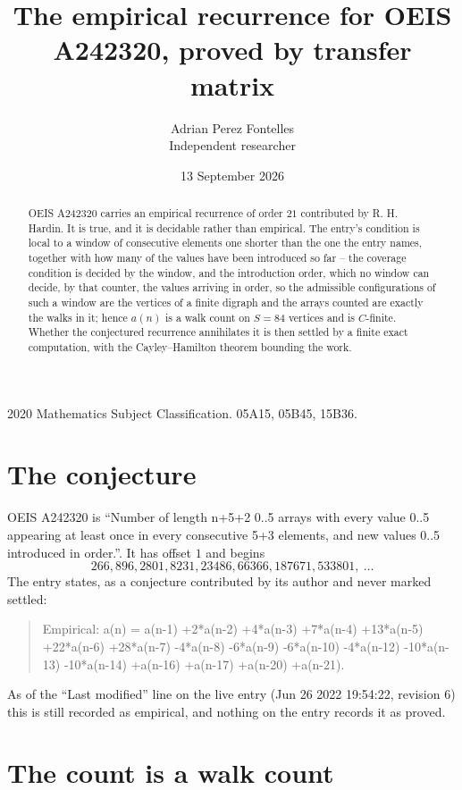 \documentclass[11pt,a4paper]{article}
\title{The empirical recurrence for OEIS A242320, proved by transfer matrix}
\author{Adrian Perez Fontelles\\ \small Independent researcher}
\date{13 September 2026}
\theoremstyle{plain}
\theoremstyle{definition}
\begin{document}
\maketitle

\begin{abstract}
OEIS A242320 carries an empirical recurrence of order $21$ contributed by R. H. Hardin. It is
true, and it is decidable rather than empirical. The entry's condition is local to a window of consecutive elements one shorter than the one the entry names, together with how many of the values have been introduced so far -- the coverage condition is decided by the window, and the introduction order, which no window can decide, by that counter, the values arriving in order, so
the admissible configurations of such a window are the vertices of a finite digraph and the
arrays counted are exactly the walks in it; hence $a(n)$ is a walk count on $S=84$ vertices
and is $C$-finite. Whether the conjectured recurrence annihilates it is then settled by a
finite exact computation, with the Cayley--Hamilton theorem bounding the work.
\end{abstract}

\noindent\small 2020 Mathematics Subject Classification. 05A15, 05B45, 15B36.\normalsize

\section{The conjecture}

OEIS A242320 is ``Number of length n+5+2 0..5 arrays with every value 0..5 appearing at least once in every consecutive 5+3 elements, and new values 0..5 introduced in order.''. It has offset $1$ and begins
\[
266, 896, 2801, 8231, 23486, 66366, 187671, 533801,\ \dots
\]
The entry states, as a conjecture contributed by its author and never marked settled:
\begin{quote}
Empirical: a(n) = a(n-1) +2*a(n-2) +4*a(n-3) +7*a(n-4) +13*a(n-5) +22*a(n-6) +28*a(n-7) -4*a(n-8) -6*a(n-9) -6*a(n-10) -4*a(n-12) -10*a(n-13) -10*a(n-14) +a(n-16) +a(n-17) +a(n-20) +a(n-21).
\end{quote}
As of the ``Last modified'' line on the live entry (Jun 26 2022 19:54:22, revision 6) this is still
recorded as empirical, and nothing on the entry records it as proved.

\section{The count is a walk count}
\end{document}
